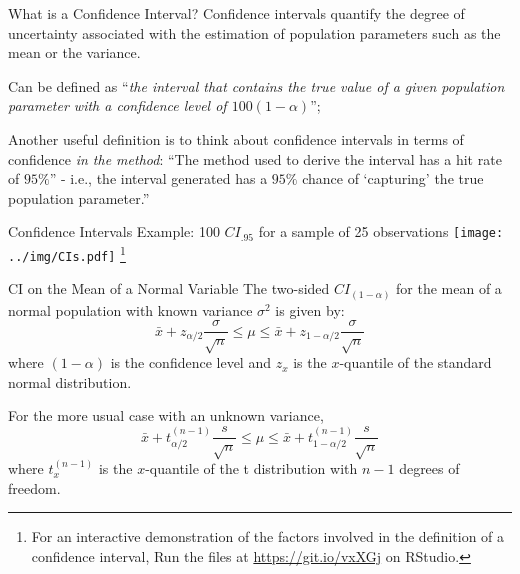 
\begin{frame}{What is a Confidence Interval?}
Confidence intervals quantify the degree of uncertainty associated with the estimation of population parameters such as the mean or the variance.\bigskip

Can be defined as ``\textit{the interval that contains the true value of a given population parameter with a confidence level of $100(1-\alpha)$}'';\bigskip

Another useful definition is to think about confidence intervals in terms of confidence \textit{in the method}: ``The method used to derive the interval has a hit rate of $95\%$'' - i.e., the interval generated has a $95\%$ chance of `capturing' the true population parameter.''
\end{frame}


\begin{frame}
{Confidence Intervals}
{Example: 100 $CI_{.95}$ for a sample of 25 observations}
\centering\texttt{[image: ../img/CIs.pdf]}
\footnote{For an interactive demonstration of the factors involved in the definition of a confidence interval, Run the files at \url{https://git.io/vxXGj} on RStudio.}
\end{frame}



\begin{frame}{CI on the Mean of a Normal Variable}
The two-sided $CI_{(1-\alpha)}$ for the mean of a normal population with known variance $\sigma^2$ is given by:
\begin{equation*}
\bar{x}+z_{\alpha/2}\frac{\sigma}{\sqrt{n}}\leq\mu\leq\bar{x}+z_{1-\alpha/2}\frac{\sigma}{\sqrt{n}}
\end{equation*}
\noindent where $(1-\alpha)$ is the confidence level and $z_{x}$ is the $x$-quantile of the standard normal distribution.
\bigskip

For the more usual case with an unknown variance,
\begin{equation*}
\bar{x}+t_{\alpha/2}^{(n-1)}\frac{s}{\sqrt{n}}\leq\mu\leq\bar{x}+t_{1-\alpha/2}^{(n-1)}\frac{s}{\sqrt{n}}
\end{equation*}
\noindent where $t_{x}^{(n-1)}$ is the $x$-quantile of the t distribution with $n-1$ degrees of freedom.
\end{frame}

